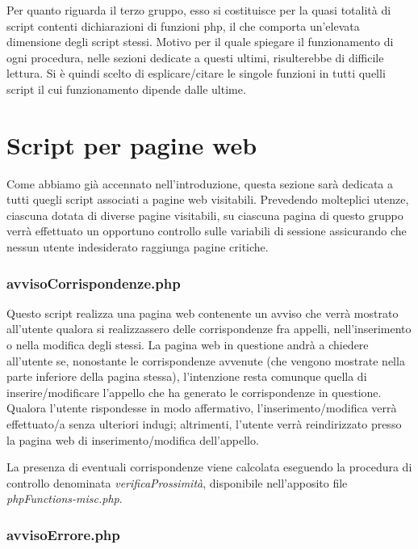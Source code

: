 \documentclass [a4paper,11pt]{book}
\begin{document}
\medskip

Per quanto riguarda il terzo gruppo, esso si costituisce per la quasi totalità di script contenti dichiarazioni di funzioni php, il che comporta un'elevata dimensione degli script stessi. Motivo per il quale spiegare il funzionamento di ogni procedura, nelle sezioni dedicate a questi ultimi, risulterebbe di difficile lettura. Si è quindi scelto di esplicare/citare le singole funzioni in tutti quelli script il cui funzionamento dipende dalle ultime.
 
\medskip

\section{Script per pagine web}

Come abbiamo già accennato nell'introduzione, questa sezione sarà dedicata a tutti quegli script associati a pagine web visitabili. Prevedendo molteplici utenze, ciascuna dotata di diverse pagine visitabili, su ciascuna pagina di questo gruppo verrà effettuato un opportuno controllo sulle variabili di sessione assicurando che nessun utente indesiderato raggiunga pagine critiche.

\subsubsection{avvisoCorrispondenze.php}

Questo script realizza una pagina web contenente un avviso che verrà mostrato all'utente qualora si realizzassero delle corrispondenze fra appelli, nell'inserimento o nella modifica degli stessi. La pagina web in questione andrà a chiedere all'utente se, nonostante le corrispondenze avvenute (che vengono mostrate nella parte inferiore della pagina stessa), l'intenzione resta comunque quella di inserire/modificare l'appello che ha generato le corrispondenze in questione. Qualora l'utente rispondesse in modo affermativo, l'inserimento/modifica verrà effettuato/a senza ulteriori indugi; altrimenti, l'utente verrà reindirizzato presso la pagina web di inserimento/modifica dell'appello.

La presenza di eventuali corrispondenze viene calcolata eseguendo la procedura di controllo denominata \emph{verificaProssimità}, disponibile nell'apposito file \emph{phpFunctions-misc.php}.

\medskip

\subsubsection{avvisoErrore.php}
\end{document}
